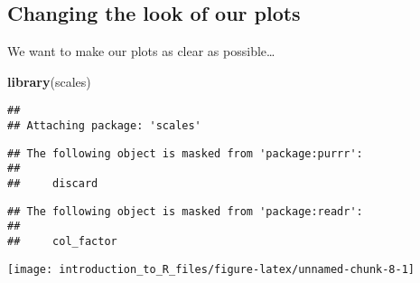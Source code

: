 \documentclass[]{tufte-handout}
\newenvironment{Shaded}{}{}
\newcommand{\CommentTok}[1]{\textcolor[rgb]{0.38,0.63,0.69}{\textit{#1}}}
\newcommand{\DataTypeTok}[1]{\textcolor[rgb]{0.56,0.13,0.00}{#1}}
\newcommand{\KeywordTok}[1]{\textcolor[rgb]{0.00,0.44,0.13}{\textbf{#1}}}
\newcommand{\NormalTok}[1]{#1}
\newcommand{\OperatorTok}[1]{\textcolor[rgb]{0.40,0.40,0.40}{#1}}
\newcommand{\StringTok}[1]{\textcolor[rgb]{0.25,0.44,0.63}{#1}}
\begin{document}
\hypertarget{changing-the-look-of-our-plots}{%
\subsection{Changing the look of our
plots}\label{changing-the-look-of-our-plots}}

We want to make our plots as clear as possible\ldots{}

\begin{Shaded}
\begin{Highlighting}[]
\KeywordTok{library}\NormalTok{(scales)}
\end{Highlighting}
\end{Shaded}

\begin{verbatim}
## 
## Attaching package: 'scales'
\end{verbatim}

\begin{verbatim}
## The following object is masked from 'package:purrr':
## 
##     discard
\end{verbatim}

\begin{verbatim}
## The following object is masked from 'package:readr':
## 
##     col_factor
\end{verbatim}

\begin{Shaded}
\end{Shaded}

\texttt{[image: introduction\_to\_R\_files/figure-latex/unnamed-chunk-8-1]}

\begin{Shaded}
\end{Shaded}
\end{document}
